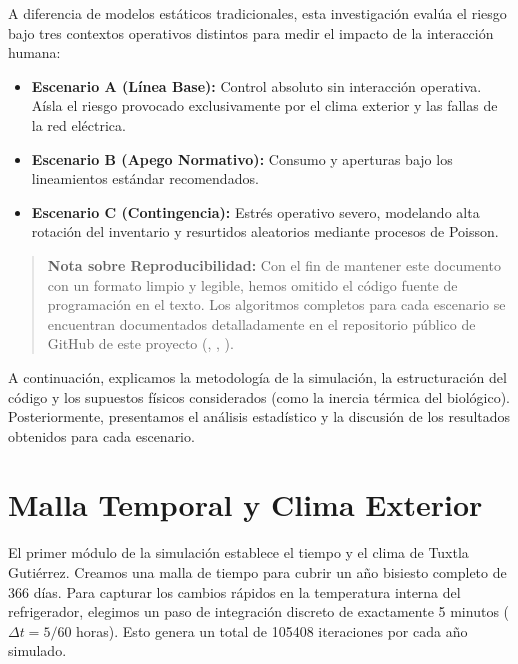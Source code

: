\documentclass[
  spanish,
  us-letterpaper,
]{scrreprt}
\providecommand{\tightlist}{%
  \setlength{\itemsep}{0pt}\setlength{\parskip}{0pt}}
\numberwithin{equation}{section}
\theoremstyle{plain}
\theoremstyle{plain}
\theoremstyle{definition}
\theoremstyle{plain}
\theoremstyle{remark}
\begin{document}
A diferencia de modelos estáticos tradicionales, esta investigación
evalúa el riesgo bajo tres contextos operativos distintos para medir el
impacto de la interacción humana:

\begin{itemize}
\tightlist
\item
  \textbf{Escenario A (Línea Base):} Control absoluto sin interacción
  operativa. Aísla el riesgo provocado exclusivamente por el clima
  exterior y las fallas de la red eléctrica.
\item
  \textbf{Escenario B (Apego Normativo):} Consumo y aperturas bajo los
  lineamientos estándar recomendados.
\item
  \textbf{Escenario C (Contingencia):} Estrés operativo severo,
  modelando alta rotación del inventario y resurtidos aleatorios
  mediante procesos de Poisson.
\end{itemize}

\begin{quote}
\textbf{Nota sobre Reproducibilidad:} Con el fin de mantener este
documento con un formato limpio y legible, hemos omitido el código
fuente de programación en el texto. Los algoritmos completos para cada
escenario se encuentran documentados detalladamente en el repositorio
público de GitHub de este proyecto
(,
,
).
\end{quote}

A continuación, explicamos la metodología de la simulación, la
estructuración del código y los supuestos físicos considerados (como la
inercia térmica del biológico). Posteriormente, presentamos el análisis
estadístico y la discusión de los resultados obtenidos para cada
escenario.

\section{Malla Temporal y Clima
Exterior}\label{malla-temporal-y-clima-exterior}

El primer módulo de la simulación establece el tiempo y el clima de
Tuxtla Gutiérrez. Creamos una malla de tiempo para cubrir un año
bisiesto completo de 366 días. Para capturar los cambios rápidos en la
temperatura interna del refrigerador, elegimos un paso de integración
discreto de exactamente 5 minutos (\(\Delta t = 5/60\) horas). Esto
genera un total de 105408 iteraciones por cada año simulado.
\end{document}
